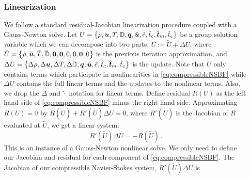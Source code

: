 \documentclass[Dissertation.tex]{subfiles}
\begin{document}
\subsubsection{Linearization}
We follow a standard residual-Jacobian linearization procedure coupled with a Gauss-Newton solve.
Let $U=\left\{ \rho,\boldsymbol u,T,\mathbb{D},\boldsymbol q,\hat{\boldsymbol u},\hat e,\hat t_c,\hat{\boldsymbol t}_m,\hat t_e \right\}$ be a group solution variable which we can decompose into two parts:
$U:=\tilde U+\Delta U$, where
$\tilde U = \left\{ \tilde\rho,\tilde{\boldsymbol u},\tilde T,\tilde{\mathbb{D}},\boldsymbol{0},\boldsymbol{0},0,0,\boldsymbol{0},0 \right\}$ is the previous iteration approximation, 
and $\Delta U=\left\{ \Delta\rho,\Delta\boldsymbol u,\Delta T,\Delta\mathbb{D},\boldsymbol q,\hat{\boldsymbol u},\hat e,\hat t_c,\hat{\boldsymbol t}_m,\hat t_e \right\}$ is the update.
Note that $\tilde U$ only contains terms which participate in nonlinearities in \eqref{eq:compressibleNSBF} 
while $\Delta U$ contains the full linear terms and the updates to the nonlinear terms.
Also, we drop the $\Delta$ and $\tilde\cdot$ notation for linear terms.
Define residual $R(U)$ as the left hand side of \eqref{eq:compressibleNSBF} minus the right hand side.
Approximating $R(U)=0$ by $R(\tilde U)+R'(\tilde U)\Delta U=0$, where $R'(\tilde U)$ is the Jacobian of $R$ evaluated at $\tilde U$, we get a linear system:
\begin{equation}
	R'(\tilde U)\Delta U=-R(\tilde U)\,.
\end{equation}
This is an instance of a Gauss-Newton nonlinear solve.
We only need to define our Jacobian and residual for each component of \eqref{eq:compressibleNSBF}. 
The Jacobian of our compressible Navier-Stokes system, $R'(\tilde U)\Delta U$ is
\end{document}
